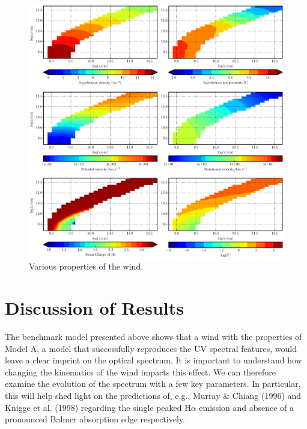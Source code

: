 \documentclass[preprint, a4paper, 11pt]{aastex}
\begin{document}
\begin{figure} %
\includegraphics[width=\textwidth]{figures/fig5.eps}
\caption{Various properties of the wind.}
\label{wind}
\end{figure} %










%
%

\section{Discussion of Results}

The benchmark model presented above shows that a wind with the properties
of Model A, a model that successfully reproduces the UV spectral features,
would leave a clear imprint on the optical spectrum. It is important
to understand how changing the kinematics of the wind impacts this
effect. We can therefore examine the evolution
of the spectrum with a few key parameters. In particular, this
will help shed light on the predictions of, e.g., Murray \& Chiang (1996)
and Knigge et al. (1998) regarding the single peaked H$\alpha$ emission
and absence of a pronounced Balmer absorption edge respectively.
\end{document}
